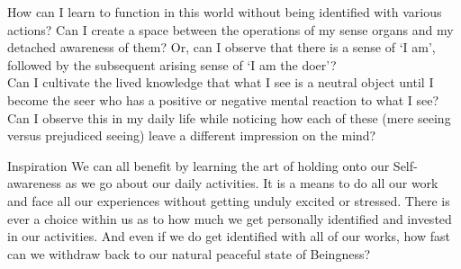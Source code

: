 


\newpage
\begin{mananam}{} 
\mananamtext How can I learn to function in this world without being identified with various actions? Can I create a space between the operations of my sense organs and my detached awareness of them? Or, can I observe that there is a sense of ‘I am’, followed by the subsequent arising sense of ‘I am the doer’?\\ 
Can I cultivate the lived knowledge that what I see is a neutral object until I become the seer who has a positive or negative mental reaction to what I see? Can I observe this in my daily life while noticing how each of these (mere seeing versus prejudiced seeing) leave a different impression on the mind? 
\end{mananam}
\WritingHand{}
\begin{inspiration}{\mananamfont Inspiration}
\mananamtext We can all benefit by learning the art of holding onto our Self-awareness as we go about our daily activities. It is a means to do all our work and face all our experiences without getting unduly excited or stressed. There is ever a choice within us as to how much we get personally identified and invested in our activities. And even if we do get identified with all of our works, how fast can we withdraw back to our natural peaceful state of Beingness?
\end{inspiration}
\newpage


